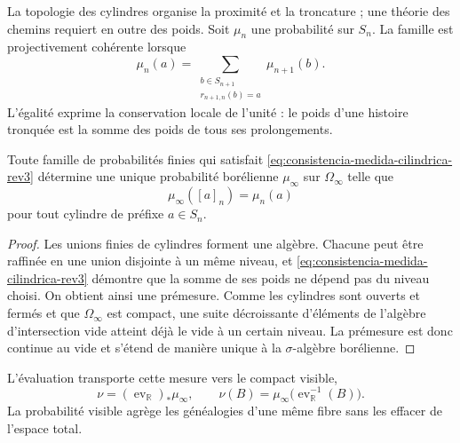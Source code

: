 La topologie des cylindres organise la proximité et la troncature ; une théorie des
chemins requiert en outre des poids. Soit \(\mu_n\) une probabilité sur \(S_n\).
La famille est projectivement cohérente lorsque
\begin{equation}
 \mu_n(a)=
 \sum_{\substack{b\in S_{n+1}\\r_{n+1,n}(b)=a}}\mu_{n+1}(b).
 \label{eq:consistencia-medida-cilindrica-rev3}
\end{equation}
L'égalité exprime la conservation locale de l'unité : le poids d'une
histoire tronquée est la somme des poids de tous ses prolongements.

\begin{theorem}
\label{thm:medida-genealogica-limite-rev3}
Toute famille de probabilités finies qui satisfait
\eqref{eq:consistencia-medida-cilindrica-rev3} détermine une unique
probabilité borélienne \(\mu_\infty\) sur \(\Omega_\infty\) telle que
\begin{equation}
 \mu_\infty([a]_n)=\mu_n(a)
 \label{eq:medida-cilindro-rev3}
\end{equation}
pour tout cylindre de préfixe \(a\in S_n\).
\end{theorem}

\begin{proof}
Les unions finies de cylindres forment une algèbre. Chacune peut
être raffinée en une union disjointe à un même niveau, et
\eqref{eq:consistencia-medida-cilindrica-rev3} démontre que la somme de ses
poids ne dépend pas du niveau choisi. On obtient ainsi une prémesure. Comme les
cylindres sont ouverts et fermés et que \(\Omega_\infty\) est compact, une
suite décroissante d'éléments de l'algèbre d'intersection vide atteint
déjà le vide à un certain niveau. La prémesure est donc continue au vide
et s'étend de manière unique à la \(\sigma\)-algèbre borélienne.
\end{proof}

L'évaluation transporte cette mesure vers le compact visible,
\begin{equation}
 \nu=(\operatorname{ev}_{\mathbb R})_*\mu_\infty,
 \qquad
 \nu(B)=\mu_\infty\bigl(\operatorname{ev}_{\mathbb R}^{-1}(B)\bigr).
 \label{eq:pushforward-medida-visible-rev3}
\end{equation}
La probabilité visible agrège les généalogies d'une même fibre sans
les effacer de l'espace total.

